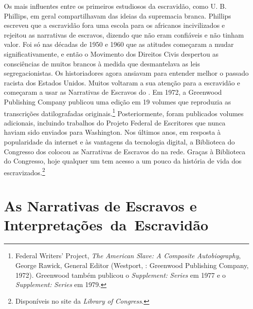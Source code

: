 Os mais influentes entre os primeiros estudiosos da escravidão, como U.
B. Phillips, em geral compartilhavam das ideias da supremacia branca.
Phillips escreveu que a escravidão fora uma escola para os africanos
incivilizados e rejeitou as narrativas de escravos, dizendo que não eram
confiáveis e não tinham valor. Foi só nas décadas de 1950 e 1960 que as
atitudes começaram a mudar significativamente, e então o Movimento dos
Direitos Civis despertou as consciências de muitos brancos à medida que
desmantelava as leis segregacionistas. Os historiadores agora ansiavam
para entender melhor o passado racista dos Estados Unidos. Muitos
voltaram a sua atenção para a escravidão e começaram a usar as
Narrativas de Escravos do . Em 1972, a Greenwood Publishing Company
publicou uma edição em 19 volumes que reproduzia as transcrições
datilografadas originais.\footnote{Federal Writers' Project, \emph{The
  American Slave: A Composite Autobiography}, George Rawick, General
  Editor (Westport, : Greenwood Publishing Company, 1972). Greenwood
  também publicou o \emph{Supplement: Series } em 1977 e o
  \emph{Supplement: Series } em 1979.} Posteriormente, foram
publicados volumes adicionais, incluindo trabalhos do Projeto Federal de
Escritores que nunca haviam sido enviados para Washington. Nos últimos
anos, em resposta à popularidade da internet e às vantagens da
tecnologia digital, a Biblioteca do Congresso dos  colocou as
Narrativas de Escravos do  na rede. Graças à Biblioteca do Congresso,
hoje qualquer um tem acesso a um pouco da história de vida dos
escravizados.\footnote{Disponíveis no site da \emph{Library of Congress}.}



\section{As Narrativas de Escravos e Interpretações~da~Escravidão}

